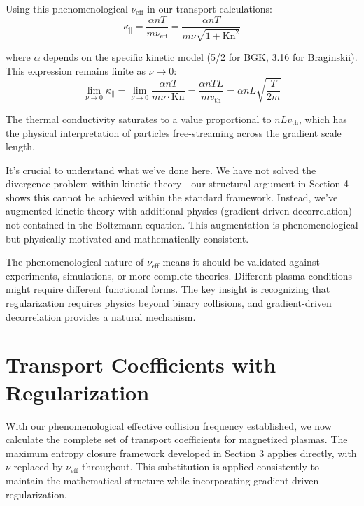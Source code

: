 \documentclass[12pt,a4paper]{article}
\newcommand{\Kn}{\text{Kn}}
\newcommand{\eff}{\text{eff}}
\begin{document}
Using this phenomenological $\nu_{\eff}$ in our transport calculations:
\begin{equation}
\kappa_{\parallel} = \frac{\alpha nT}{m\nu_{\eff}} = \frac{\alpha nT}{m\nu\sqrt{1 + \Kn^2}}
\label{eq:kappa_alpha}
\end{equation}

where $\alpha$ depends on the specific kinetic model (5/2 for BGK, 3.16 for Braginskii). This expression remains finite as $\nu \to 0$:
\begin{equation}
\lim_{\nu \to 0} \kappa_{\parallel} = \lim_{\nu \to 0} \frac{\alpha nT}{m\nu \cdot \Kn} = \frac{\alpha nTL}{mv_{\text{th}}} = \alpha nL\sqrt{\frac{T}{2m}}
\label{eq:kappa_collisionless_limit}
\end{equation}

The thermal conductivity saturates to a value proportional to $nLv_{\text{th}}$, which has the physical interpretation of particles free-streaming across the gradient scale length.

It's crucial to understand what we've done here. We have not solved the divergence problem within kinetic theory—our structural argument in Section 4 shows this cannot be achieved within the standard framework. Instead, we've augmented kinetic theory with additional physics (gradient-driven decorrelation) not contained in the Boltzmann equation. This augmentation is phenomenological but physically motivated and mathematically consistent.

The phenomenological nature of $\nu_{\eff}$ means it should be validated against experiments, simulations, or more complete theories. Different plasma conditions might require different functional forms. The key insight is recognizing that regularization requires physics beyond binary collisions, and gradient-driven decorrelation provides a natural mechanism.

\section{Transport Coefficients with Regularization}

With our phenomenological effective collision frequency established, we now calculate the complete set of transport coefficients for magnetized plasmas. The maximum entropy closure framework developed in Section 3 applies directly, with $\nu$ replaced by $\nu_{\eff}$ throughout. This substitution is applied consistently to maintain the mathematical structure while incorporating gradient-driven regularization.
\end{document}
